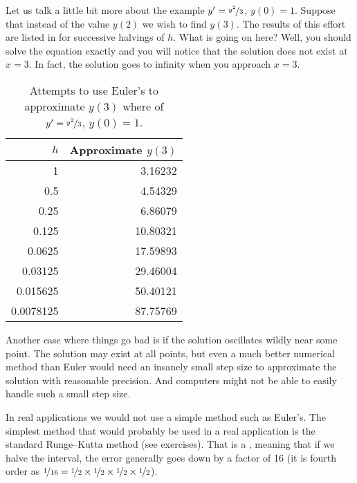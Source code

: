 Let us talk a little bit more about the example
$y' = \nicefrac{y^2}{3}$, $y(0) =
1$.  Suppose that instead of the value $y(2)$ we wish to find $y(3)$.
The results of this effort are listed in
 for successive halvings of $h$.  What is
going on here?  Well, you should solve the equation exactly and you will
notice that the solution does not exist at $x=3$.  In fact, the solution goes
to infinity when you approach $x=3$.

\begin{table}[h!t]
\mybeginframe
\capstart
\begin{center}
\begin{tabular}{@{}rr@{}}
\toprule
$h$ & Approximate $y(3)$ \\
\midrule
1        & 3.16232 \\
0.5      & 4.54329 \\
0.25     & 6.86079 \\
0.125    & 10.80321 \\
0.0625   & 17.59893 \\
0.03125  & 29.46004 \\
0.015625 & 50.40121 \\
0.0078125& 87.75769 \\
\bottomrule
\end{tabular}
\end{center}
\caption{Attempts to use Euler's to approximate $y(3)$ where
of $y'=\nicefrac{y^2}{3}$, $y(0)=1$.\label{euler-table2:table}}
\myendframe
\end{table}

Another case where things go bad is if the solution oscillates wildly
near some point.
The solution
may exist at all points, but even a much better numerical method than
Euler would need an insanely small step size to approximate the solution
with reasonable precision.
And computers might not be able to easily handle such a small step size.

\medskip

In real applications we would not use a simple method such as Euler's.  The
simplest method that would probably be used in a real application is the
standard Runge--Kutta method (see exercises).  That is a
,
meaning that if we halve the interval, the error generally
goes down by a factor of 16 (it is fourth order as $\nicefrac{1}{16} =
\nicefrac{1}{2} \times \nicefrac{1}{2}
\times \nicefrac{1}{2} \times \nicefrac{1}{2}$).

